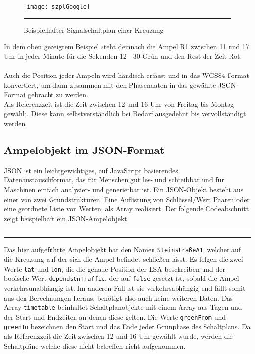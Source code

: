 \begin{figure}[H]
\centering
	\texttt{[image: szplGoogle]}
	\rule{36em}{0.5pt}
	\caption[Signalplan]{Beispielhafter Signalschaltplan einer Kreuzung}
	\label{fig:plan}	
\end{figure}
In dem oben gezeigtem Beispiel steht demnach die Ampel R1 zwischen 11 und 17 Uhr in jeder Minute für die Sekunden 12 - 30 Grün und den Rest der Zeit Rot.\\\\
Auch die Position jeder Ampeln wird händisch erfasst und in das WGS84-Format konvertiert, um dann zusammen mit den Phasendaten in das gewählte \gls{JSON}-Format gebracht zu werden.\\
Als Referenzzeit ist die Zeit zwischen 12 und 16 Uhr von Freitag bis Montag gewählt. Diese kann selbstverständlich bei Bedarf ausgedehnt bis vervollständigt werden.
%
%
\subsection[Ampelobjekt im JSON-Format]{Ampelobjekt im \gls{JSON}-Format}
\gls{JSON} ist ein leichtgewichtiges, auf JavaScript basierendes, Datenaustauschformat, das für Menschen gut les- und schreibbar und für Maschinen einfach analysier- und generierbar ist. Ein \gls{JSON}-Objekt besteht aus einer von zwei Grundstrukturen. Eine Auflistung von Schlüssel/Wert Paaren oder eine geordnete Liste von Werten, als Array realisiert. Der folgende Codeabschnitt zeigt beispielhaft ein \gls{JSON}-Ampelobjekt:  
\begin{center}
\rule{35em}{0.5pt}

\rule{35em}{0.5pt}
\end{center}
Das hier aufgeführte Ampelobjekt hat den Namen \texttt{SteinstraßeA1}, welcher auf die Kreuzung auf der sich die Ampel befindet schließen lässt. Es folgen die zwei Werte \texttt{lat} und \texttt{lon}, die die genaue Position der \gls{LSA} beschreiben und der boolsche Wert \texttt{dependsOnTraffic}, der auf \texttt{false} gesetzt ist, sobald die Ampel verkehrsunabhängig ist. Im anderen Fall ist sie verkehrsabhängig und fällt somit aus den Berechnungen heraus, benötigt also auch keine weiteren Daten. Das Array \texttt{timetable} beinhaltet Schaltplanobjekte mit einem Array aus Tagen und der Start-und Endzeiten an denen diese gelten. Die Werte \texttt{greenFrom} und \texttt{greenTo} bezeichnen den Start und das Ende jeder Grünphase des Schaltplans. Da als Referenzzeit die Zeit zwischen 12 und 16 Uhr gewählt wurde, werden die Schaltpläne welche diese nicht betreffen nicht aufgenommen.
\clearpage
